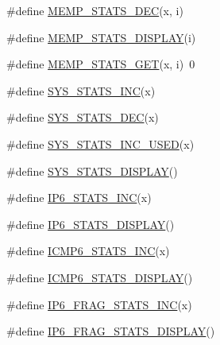 \begin{DoxyCompactItemize}
\item 
\#define \hyperlink{openmote-cc2538_2lwip_2src_2include_2lwip_2stats_8h_acdadac8ecdb9710b2cbd0a0dc4a9d4c1}{M\+E\+M\+P\+\_\+\+S\+T\+A\+T\+S\+\_\+\+D\+EC}(x,  i)
\item 
\#define \hyperlink{openmote-cc2538_2lwip_2src_2include_2lwip_2stats_8h_a7470beb09784d7479501a636079c2211}{M\+E\+M\+P\+\_\+\+S\+T\+A\+T\+S\+\_\+\+D\+I\+S\+P\+L\+AY}(i)
\item 
\#define \hyperlink{openmote-cc2538_2lwip_2src_2include_2lwip_2stats_8h_a9ceeb1ff91122d7f656a64665e43b0b5}{M\+E\+M\+P\+\_\+\+S\+T\+A\+T\+S\+\_\+\+G\+ET}(x,  i)~0
\item 
\#define \hyperlink{openmote-cc2538_2lwip_2src_2include_2lwip_2stats_8h_a4a229152af46f4609e7916c3506f1fb5}{S\+Y\+S\+\_\+\+S\+T\+A\+T\+S\+\_\+\+I\+NC}(x)
\item 
\#define \hyperlink{openmote-cc2538_2lwip_2src_2include_2lwip_2stats_8h_a608a7fc721b815f1a5a77125cc1c0b74}{S\+Y\+S\+\_\+\+S\+T\+A\+T\+S\+\_\+\+D\+EC}(x)
\item 
\#define \hyperlink{openmote-cc2538_2lwip_2src_2include_2lwip_2stats_8h_a506c20693f361bc2cdd2c7d86e780375}{S\+Y\+S\+\_\+\+S\+T\+A\+T\+S\+\_\+\+I\+N\+C\+\_\+\+U\+S\+ED}(x)
\item 
\#define \hyperlink{openmote-cc2538_2lwip_2src_2include_2lwip_2stats_8h_ac82dcbecd8e2683231386511c7bd1b89}{S\+Y\+S\+\_\+\+S\+T\+A\+T\+S\+\_\+\+D\+I\+S\+P\+L\+AY}()
\item 
\#define \hyperlink{openmote-cc2538_2lwip_2src_2include_2lwip_2stats_8h_af38ba685afe9de39bd971c83b443ea37}{I\+P6\+\_\+\+S\+T\+A\+T\+S\+\_\+\+I\+NC}(x)
\item 
\#define \hyperlink{openmote-cc2538_2lwip_2src_2include_2lwip_2stats_8h_a022dc55f4c54659d588da17e7ced1e71}{I\+P6\+\_\+\+S\+T\+A\+T\+S\+\_\+\+D\+I\+S\+P\+L\+AY}()
\item 
\#define \hyperlink{openmote-cc2538_2lwip_2src_2include_2lwip_2stats_8h_a8bb9ee6af1218b8d9973815fa866260c}{I\+C\+M\+P6\+\_\+\+S\+T\+A\+T\+S\+\_\+\+I\+NC}(x)
\item 
\#define \hyperlink{openmote-cc2538_2lwip_2src_2include_2lwip_2stats_8h_abc1cea8fb9afffa0e7212f78e96397c0}{I\+C\+M\+P6\+\_\+\+S\+T\+A\+T\+S\+\_\+\+D\+I\+S\+P\+L\+AY}()
\item 
\#define \hyperlink{openmote-cc2538_2lwip_2src_2include_2lwip_2stats_8h_ac74aa05083bf4034fe2cc1efd5fde36c}{I\+P6\+\_\+\+F\+R\+A\+G\+\_\+\+S\+T\+A\+T\+S\+\_\+\+I\+NC}(x)
\item 
\#define \hyperlink{openmote-cc2538_2lwip_2src_2include_2lwip_2stats_8h_adfb7a077b87d62907b2747140f121315}{I\+P6\+\_\+\+F\+R\+A\+G\+\_\+\+S\+T\+A\+T\+S\+\_\+\+D\+I\+S\+P\+L\+AY}()

\end{DoxyCompactItemize}
